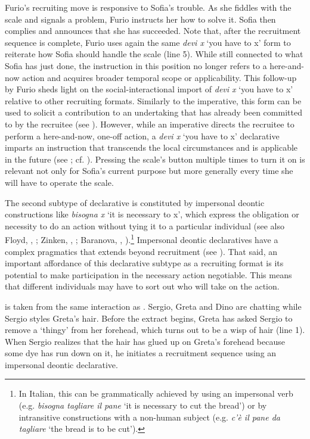 \documentclass[output=paper,modfonts]{langscibook}
\begin{document}
Furio's recruiting move is responsive to Sofia's trouble. As she fiddles with the scale and signals a problem, Furio instructs her how to solve it. Sofia then complies and announces that she has succeeded. Note that, after the recruitment sequence is complete, Furio uses again the same \textit{devi x} ‘you have to x’ form to reiterate how Sofia should handle the scale (line 5). While still connected to what Sofia has just done, the instruction in this position no longer refers to a here-and-now action and acquires broader temporal scope or applicability. This follow-up by Furio sheds light on the social-interactional import of \textit{devi x} ‘you have to x’ relative to other recruiting formats. Similarly to the imperative, this form can be used to solicit a contribution to an undertaking that has already been committed to by the recruitee (see ). However, while an imperative directs the recruitee to perform a here-and-now, one-off action, a \textit{devi x} ‘you have to x’ declarative imparts an instruction that transcends the local circumstances and is applicable in the future (see \citealt{Parry2013,Raevaara2017}; cf. \citealt[117--130]{Zinken2016}). Pressing the scale's button multiple times to turn it on is relevant not only for Sofia's current purpose but more generally every time she will have to operate the scale.

The second subtype of declarative is constituted by impersonal deontic constructions like \textit{bisogna x} ‘it is necessary to x’, which express the obligation or necessity to do an action without tying it to a particular individual (see also Floyd, , ; Zinken, , ; Baranova, , ).\footnote{In Italian, this can be grammatically achieved by using an impersonal verb (e.g. \textit{bisogna tagliare il pane} ‘it is necessary to cut the bread’) or by intransitive constructions with a non-human subject (e.g. \textit{c’è il pane da tagliare} ‘the bread is to be cut’).} Impersonal deontic declaratives have a complex pragmatics that extends beyond recruitment (see \citealt{ZinkenOgiermann2011,RossiZinken2016}). That said, an important affordance of this declarative subtype as a recruiting format is its potential to make participation in the necessary action negotiable. This means that different individuals may have to sort out who will take on the action.

 is taken from the same interaction as . Sergio, Greta and Dino are chatting while Sergio styles Greta's hair. Before the extract begins, Greta has asked Sergio to remove a ‘thingy’ from her forehead, which turns out to be a wisp of hair (line 1). When Sergio realizes that the hair has glued up on Greta's forehead because some dye has run down on it, he initiates a recruitment sequence using an impersonal deontic declarative.
\end{document}
